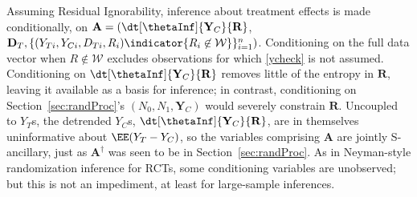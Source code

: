 
\sloppy
Assuming Residual Ignorability, inference about treatment effects is
made conditionally, on
$\mathbf{A}= (\dt[\thetaInf]{\mathbf{Y}_{C}}{ \mathbf{R}}$, $\mathbf{D}_{T},
\{(Y_{Ti}, Y_{Ci}, D_{Ti}, R_{i}) \indicator{{R}_{i} \not\in
  \mathcal{W}}\}_{i=1}^{n})$.
Conditioning on the full data vector when $R \not\in \mathcal{W}$
excludes observations for which \eqref{ycheck} is not assumed.
Conditioning on
$\dt[\thetaInf]{\mathbf{Y}_{C}}{ \mathbf{R}}$
removes little of the entropy
in $\mathbf{R}$, leaving it available as a basis for inference; in
contrast, conditioning on Section~\ref{sec:randProc}'s $(N_{0}, N_{1}, \mathbf{Y}_{C})$ would
severely constrain $\mathbf{R}$.
Uncoupled to $Y_{T}$s, the detrended  $Y_{C}$s,
$\dt[\thetaInf]{\mathbf{Y}_{C}}{ \mathbf{R}}$,
are in themselves uninformative about $\EE(Y_{T} - Y_{C})$, so
the variables comprising $\mathbf{A}$ are jointly
S-ancillary, just as $\mathbf{A}^{\dagger}$ was seen to be
in Section~\ref{sec:randProc}.  As in Neyman-style randomization inference for RCTs, some conditioning variables are
unobserved; but this is not an impediment, at least for large-sample
inferences.


